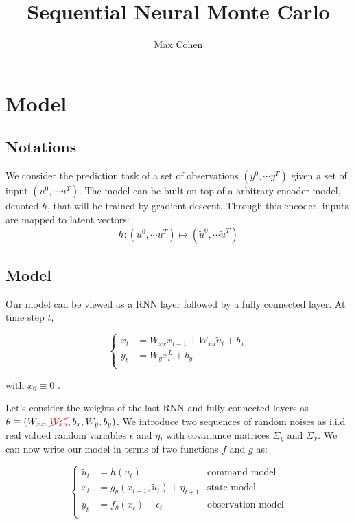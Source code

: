 \documentclass[10pt,a4paper]{report}
\begin{document}
\title{Sequential Neural Monte Carlo}
\author{Max Cohen}

\tableofcontents

\chapter{Model}
\section{Notations}
We consider the prediction task of a set of observations $(y^0, \cdots y^T)$ given a set of input $(u^0, \cdots u^T)$.
The model can be built on top of a arbitrary encoder model, denoted $h$, that will be trained by gradient descent.
Through this encoder, inputs are mapped to latent vectors:
$$
	h: (u^0, \cdots u^T) \mapsto (\tilde u^0, \cdots \tilde u^T)
$$

\section{Model}
Our model can be viewed as a RNN layer followed by a fully connected layer. At time step $t$,

\begin{equation*}
	\left\{
	\begin{aligned}
		x_t & = W_{xx} x_{t-1} + W_{xu} \tilde u_t + b_x \\
		y_t & = W_y x_t^L + b_y                        \\
	\end{aligned}
	\right.
\end{equation*}

with $x_{0} \equiv 0$ .

Let's consider the weights of the last RNN and fully connected layers as $\theta \equiv (W_{xx}, \textcolor{red}{\cancel{W_{xu}}}, b_x, W_y, b_y)$.
We introduce two sequences of random noises as i.i.d real valued random variables $\epsilon$ and $\eta$, with covariance matrices $\Sigma_y$ and $\Sigma_x$.
We can now write our model in terms of two functions $f$ and $g$ as:

\begin{equation}
	\left\{
	\begin{aligned}
		\tilde u_t & = h(u_t)                                       & \text{command model} \\
		x_t    & = g_\theta(x_{t-1}, \tilde u_t) + \eta_{t+1} & \text{state model}       \\
		y_t        & = f_\theta(x_t) + \epsilon_t                   & \text{observation model} \\
	\end{aligned}
	\right.
	\label{model_definition}
\end{equation}
\end{document}

